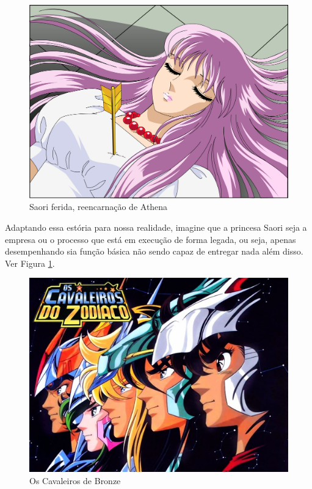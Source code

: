 \begin{figure}[H]
    \centering
    \includegraphics[scale=0.33,keepaspectratio=true]{images/08.png}
    \caption{Saori ferida, reencarnação de Athena}
    \label{pic_08}
\end{figure}

Adaptando essa estória para nossa realidade, imagine que a princesa Saori seja a empresa ou o processo que está em execução de forma legada, ou seja, apenas desempenhando sia função básica não sendo capaz de entregar nada além disso. Ver Figura \ref{pic_08}.

\begin{figure}[H]
    \centering
    \includegraphics[scale=0.33,keepaspectratio=true]{images/09.jpg}
    \caption{Os Cavaleiros de Bronze}
    \label{pic_09}
\end{figure}

